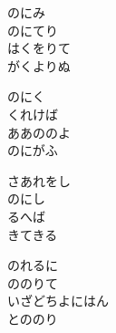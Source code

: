 \documentclass[10pt,b5j]{tarticle} %
\begin{document}
\begin{enumerate}
\begin{minipage}[c]{\blocksize}
        \vspace{\linespace}
        \item
        のにみ\\
        のにてり\\
        はくをりて\\
        がくよりぬ
        
        \vspace{\linespace}
        \item
        のにく\\
        くれけば\\
        ああののよ\\
        のにがふ
        
        \vspace{\linespace}
        \item
        さあれをし\\
        のにし\\
        るへば\\
        きてきる
        
        \vspace{\linespace}
        \item
        のれるに\\
        ののりて\\
        いざどちよにはん\\
        とののり
    
    \end{minipage}
\end{enumerate} %
\end{document}
